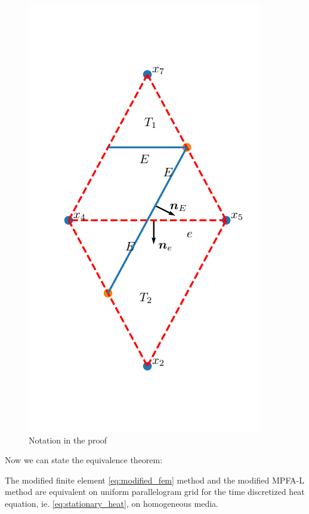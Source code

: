 \documentclass[../Main/main.tex]{subfiles}
\begin{document}
	\begin{figure}[H]
		\centering
		\includegraphics{two triangles.pdf}
		\caption{Notation in the proof}
		\label{fig:two triangles}
	\end{figure}
	Now we can state the equivalence theorem:
	\begin{theorem}
		The modified finite element \eqref{eq:modified_fem} method and the modified MPFA-L method are equivalent on uniform parallelogram grid for the time discretized heat equation, ie. \eqref{eq:stationary_heat}, on homogeneous media. 
	\end{theorem}
\end{document}
